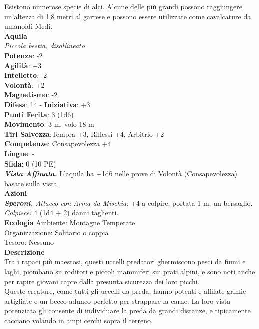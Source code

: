 \begin{multicols}{2}
Esistono numerose specie di alci. Alcune delle più grandi possono raggiungere un'altezza di 1,8 metri al garrese e possono essere utilizzate come cavalcature da umanoidi Medi.\\


\medskip\textbf{Aquila}\\
\emph{Piccola bestia, disallineato}\\
\textbf{Potenza}: -2\\
\textbf{Agilità}: +3\\
\textbf{Intelletto}: -2\\
\textbf{Volontà}: +2\\
\textbf{Magnetismo}: -2\\
\textbf{Difesa}: 14 - \textbf{Iniziativa}: +3\\
\textbf{Punti Ferita}: 3 (1d6)\\
\textbf{Movimento}: 3 m, volo 18 m\\
\textbf{Tiri Salvezza}:Tempra +3, Riflessi +4, Arbitrio +2\\
\textbf{Competenze}: Consapevolezza +4\\
\textbf{Lingue}: -\\
\textbf{Sfida}: 0 (10 PE)\smallskip\\
\emph{\textbf{Vista Affinata.}} L'aquila ha +1d6 nelle prove di Volontà (Consapevolezza) basate sulla vista.\\
\smallskip\textbf{Azioni}\\
\emph{\textbf{Speroni.} Attacco con Arma da Mischia}: +4 a colpire, portata 1 m, un bersaglio.\\
\emph{Colpisce:} 4 (1d4 + 2) danni taglienti.\\
\textbf{Ecologia}
Ambiente: Montagne Temperate\\
Organizzazione: Solitario o coppia\\
Tesoro: Nessuno\\
\textbf{Descrizione}\\
Tra i rapaci più maestosi, questi uccelli predatori ghermiscono pesci da fiumi e laghi, piombano su roditori e piccoli mammiferi sui prati alpini, e sono noti anche per rapire giovani capre dalla presunta sicurezza dei loro picchi.\\

Queste creature, come tutti gli uccelli da preda, hanno potenti e affilate grinfie artigliate e un becco adunco perfetto per strappare la carne. La loro vista potenziata gli consente di individuare la preda da grandi distanze, e tipicamente cacciano volando in ampi cerchi sopra il terreno.\\


\end{multicols}
